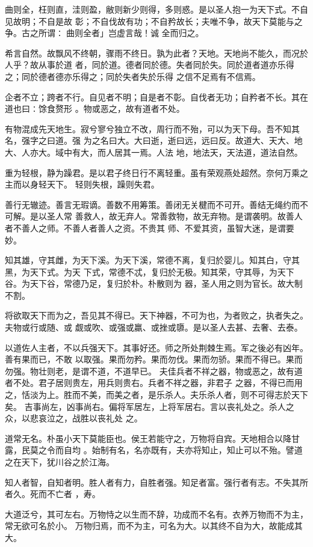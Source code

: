 \documentclass[a4paper, twoside, openany, extrafontsizes]{dlutthesis}
\begin{document}
曲则全，枉则直，洼则盈，敝则新少则得，多则惑。是以圣人抱一为天下式。不自见故明；不自是故
彰；不自伐故有功；不自矜故长；夫唯不争，故天下莫能与之争。古之所谓∶曲则全者」岂虚言哉！诚
全而归之。

希言自然。故飘风不终朝，骤雨不终日。孰为此者？天地。天地尚不能久，而况於人乎？故从事於道
者，同於道。德者同於德。失者同於失。同於道者道亦乐得之；同於德者德亦乐得之；同於失者失於乐得
之信不足焉有不信焉。

企者不立；跨者不行。自见者不明；自是者不彰。自伐者无功；自矜者不长。其在道也曰∶馀食赘形
。物或恶之，故有道者不处。

有物混成先天地生。寂兮寥兮独立不改，周行而不殆，可以为天下母。吾不知其名，强字之曰道。强
为之名曰大。大曰逝，逝曰远，远曰反。故道大、天大、地大、人亦大。域中有大，而人居其一焉。人法
地，地法天，天法道，道法自然。

重为轻根，静为躁君。是以君子终日行不离轻重。虽有荣观燕处超然。奈何万乘之主而以身轻天下。
轻则失根，躁则失君。

善行无辙迹。善言无瑕谪。善数不用筹策。善闭无关楗而不可开。善结无绳约而不可解。是以圣人常
善救人，故无弃人。常善救物，故无弃物。是谓袭明。故善人者不善人之师。不善人者善人之资。不贵其
师、不爱其资，虽智大迷，是谓要妙。

知其雄，守其雌，为天下溪。为天下溪，常德不离，复归於婴儿。知其白，守其黑，为天下式。为天
下式，常德不忒，复归於无极。知其荣，守其辱，为天下谷。为天下谷，常德乃足，复归於朴。朴散则为
器，圣人用之则为官长。故大制不割。

将欲取天下而为之，吾见其不得已。天下神器，不可为也，为者败之，执者失之。夫物或行或随、或
觑或吹、或强或羸、或挫或隳。是以圣人去甚、去奢、去泰。

以道佐人主者，不以兵强天下。其事好还。师之所处荆棘生焉。军之後必有凶年。善有果而已，不敢
以取强。果而勿矜。果而勿伐。果而勿骄。果而不得已。果而勿强。物壮则老，是谓不道，不道早已。
夫佳兵者不祥之器，物或恶之，故有道者不处。君子居则贵左，用兵则贵右。兵者不祥之器，非君子
之器，不得已而用之，恬淡为上。胜而不美，而美之者，是乐杀人。夫乐杀人者，则不可得志於天下矣。
吉事尚左，凶事尚右。偏将军居左，上将军居右。言以丧礼处之。杀人之众，以悲哀泣之，战胜以丧礼处
之。

道常无名。朴虽小天下莫能臣也。侯王若能守之，万物将自宾。天地相合以降甘露，民莫之令而自均
。始制有名，名亦既有，夫亦将知止，知止可以不殆。譬道之在天下，犹川谷之於江海。

知人者智，自知者明。胜人者有力，自胜者强。知足者富。强行者有志。不失其所者久。死而不亡者
，寿。

大道泛兮，其可左右。万物恃之以生而不辞，功成而不名有。衣养万物而不为主，常无欲可名於小。
万物归焉，而不为主，可名为大。以其终不自为大，故能成其大。
\end{document}
